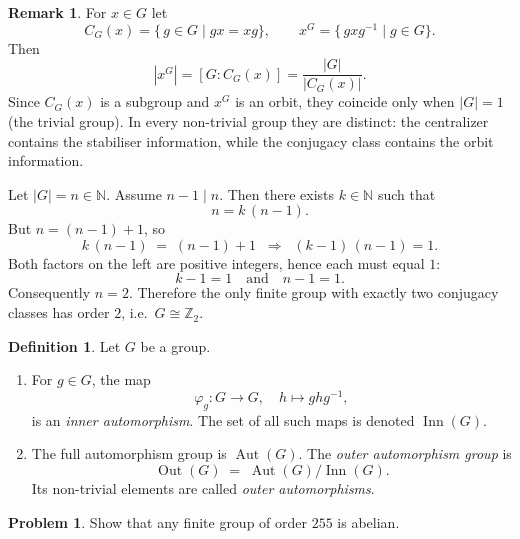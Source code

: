 \documentclass[12pt]{article}
\DeclareMathOperator{\Aut}{Aut}
\DeclareMathOperator{\Inn}{Inn}
\DeclareMathOperator{\Out}{Out}
\theoremstyle{definition} %
\newtheorem{problem}{Problem}
\newtheorem{remark}{Remark}
\newtheorem{definition}{Definition}
\theoremstyle{plain} %
\begin{document}
      \begin{remark}
        For $x\in G$ let
        \[
           C_G(x)=\{\,g\in G\mid gx=xg\},\qquad
           x^{G}=\{\,g x g^{-1}\mid g\in G\}.
        \]
        Then
        \[
           |x^{G}| = [G:C_G(x)] = \frac{|G|}{|C_G(x)|}.
        \]
        Since $C_G(x)$ is a subgroup and $x^{G}$ is an orbit, they coincide
        only when $|G|=1$ (the trivial group).  In every non-trivial group
        they are distinct: the centralizer contains the stabiliser information,
        while the conjugacy class contains the orbit information.
        \end{remark}
        Let $|G| = n \in \mathbb{N}$.
Assume $n-1 \mid n$.
Then there exists $k\in\mathbb{N}$ such that
\[
    n = k\,(n-1).
\]
But $n = (n-1)+1$, so
\[
    k\,(n-1) \;=\; (n-1)+1
    \;\;\Longrightarrow\;\;
    (k-1)\,(n-1) = 1.
\]
Both factors on the left are positive integers, hence each must equal $1$:
\[
    k-1 = 1
    \quad\text{and}\quad
    n-1 = 1.
\]
Consequently $n = 2$.  Therefore the only finite group with exactly two
conjugacy classes has order $2$, i.e.\ $G \cong \mathbb{Z}_2$.
\begin{definition}
  Let $G$ be a group.
  \begin{enumerate}
    \item For $g\in G$, the map
          \[
              \varphi_g : G \longrightarrow G, \quad
              h \mapsto g h g^{-1},
          \]
          is an \emph{inner automorphism}.
          The set of all such maps is denoted $\Inn(G)$.
    \item The full automorphism group is $\Aut(G)$.
          The \emph{outer automorphism group} is
          \[
              \Out(G) \;=\; \Aut(G)\big/ \Inn(G).
          \]
          Its non-trivial elements are called \emph{outer automorphisms}.
  \end{enumerate}
  \end{definition}
  \begin{problem}
    Show that any finite group of order $255$ is abelian.
    \end{problem}
    
\end{document}
